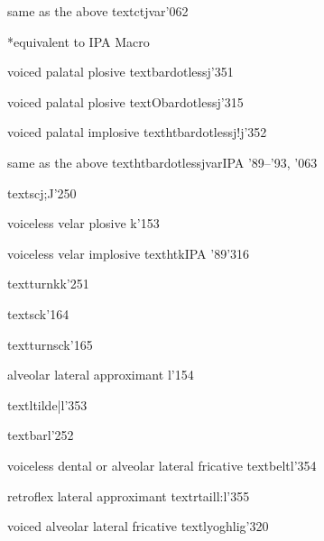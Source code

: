 %
  {same as the above}%
  {\tbs textctjvar}{}{\ipanew}{'062}

%
  {*equivalent to IPA }%
  {}{}{\PSG}{Macro}

%
  {voiced palatal plosive}%
  {\tbs textbardotlessj}{}{\ipanew}{'351}

%
  {voiced palatal plosive}%
  {\tbs textObardotlessj}{}{\ipaold}{'315}

%
  {voiced palatal implosive}%
  {\tbs texthtbardotlessj}{\tbs!j}{\Handbook}{'352}%

%
  {same as the above}%
  {\tbs texthtbardotlessjvar}{}{IPA '89--'93, \PSG}{'063}

%
  {}%
  {\tbs textscj}{\tbs;J}{\PSG}{'250}

%
  {voiceless velar plosive}%
  {k}{}{\ipaall}{'153}

%
  {voiceless velar implosive}%
  {\tbs texthtk}{}{IPA '89}{'316}

%
  {}%
  {\tbs textturnk}{\tbs*k}{\PSG}{'251}

%
  {}%
  {\tbs textsck}{}{\PSG}{'164}

%
  {}%
  {\tbs textturnsck}{}{\PSG}{'165}

%
  {alveolar lateral approximant}%
  {l}{}{\ipaall}{'154}

%
  {}%
  {\tbs textltilde}{\tbs|\ttilde l}{\ipaall}{'353}

%
  {}%
  {\tbs textbarl}{}{\PSG}{'252}

%
  {voiceless dental or alveolar lateral fricative}%
  {\tbs textbeltl}{}{\ipaall}{'354}

%
  {retroflex lateral approximant}%
  {\tbs textrtaill}{\tbs:l}{\ipaall}{'355}

%
  {voiced alveolar lateral fricative}%
  {\tbs textlyoghlig}{}{\ipanew}{'320}

